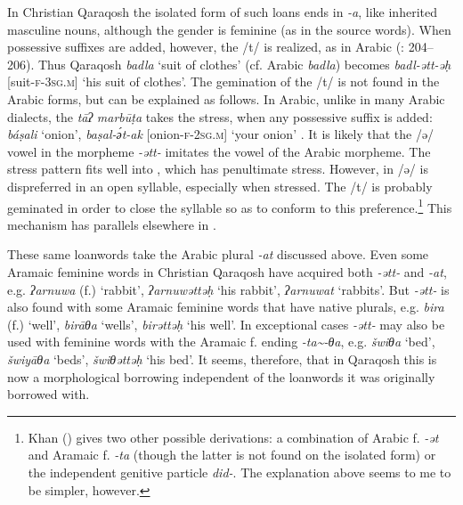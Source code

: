 \documentclass[output=paper]{langsci/langscibook}
\begin{document}
In Christian Qaraqosh the isolated form of such loans ends in \textit{{}-a}, like inherited masculine nouns, although the {gender} is feminine (as in the source words). When possessive suffixes are added, however, the /t/ is realized, as in Arabic (\citealt{Khan2002}: 204–206). Thus Qaraqosh \textit{badla} ‘suit of clothes’ (cf.  Arabic \textit{badla}) becomes \textit{badl\nobreakdash-ətt\nobreakdash-əḥ} [suit-\textsc{f-3sg.m]} ‘his suit of clothes’. The gemination of the /t/ is not found in the Arabic forms, but can be explained as follows. In  Arabic, unlike in many Arabic dialects, the \textit{tāʔ} \textit{marbūṭa} takes the {stress}, when any possessive suffix is added: \textit{báṣali} ‘onion’, \textit{baṣal\nobreakdash-ә́t\nobreakdash-ak} [onion-\textsc{f-2sg.m}] ‘your onion’ \citep[105]{Jastrow1983}. It is likely that the /ə/ vowel in the  morpheme \textit{{}-ətt-} imitates the vowel of the Arabic morpheme. The {stress} pattern fits well into , which has penultimate {stress}. However, in  /ə/ is dispreferred in an open syllable, especially when stressed. The /t/ is probably geminated in order to close the syllable so as to conform to this preference.\footnote{Khan (\citeyear[206]{Khan2002}) gives two other possible derivations: a combination of Arabic f. \textit{\nobreakdash-ət} and Aramaic f. \textit{\nobreakdash-ta} (though the latter is not found on the isolated form) or the  independent genitive particle \textit{did-}. The explanation above seems to me to be simpler, however.} This mechanism has parallels elsewhere in .

These same {loanwords} take the Arabic plural \textit{{}-at} discussed above. Even some Aramaic feminine words in Christian Qaraqosh have acquired both \textit{{}-ətt-} and \textit{\nobreakdash-at}, e.g. \textit{ʔarnuwa} (f.) ‘rabbit’, \textit{ʔarnuwəttəḥ} ‘his rabbit’, \textit{ʔarnuwat} ‘rabbits’. But \textit{{}-ətt-} is also found with some Aramaic feminine words that have native plurals, e.g. \textit{bira} (f.) ‘well’, \textit{birāθa} ‘wells’, \textit{birəttəḥ} ‘his well’. In exceptional cases \textit{{}-ətt-} may also be used with feminine words with the Aramaic f. ending \textit{{}-ta{\textasciitilde}-θa}, e.g. \textit{šwiθa} ‘bed’, \textit{šwiyāθa} ‘beds’, \textit{šwiθəttəḥ} ‘his bed’. It seems, therefore, that in Qaraqosh this is now a morphological borrowing independent of the {loanwords} it was originally borrowed with.
\end{document}
